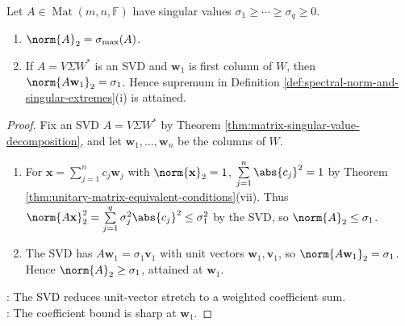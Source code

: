\begin{theorem} \label{thm:spectral-norm-largest-singular-value} \\
Let $A\in\operatorname{Mat}(m,n,\mathbb{F})$ have singular values $\sigma_1\geq\cdots\geq\sigma_q\geq0$.
\begin{enumerate}[label=(\roman*)]
\setlength{\itemsep}{0pt}
\item $\norm{A}_2=\sigma_{\max}(A)$.
\item If $A=V\Sigma W^*$ is an SVD and $\mathbf{w}_1$ is first column of $W$, then $\norm{A\mathbf{w}_1}_2=\sigma_1$. Hence supremum in Definition \ref{def:spectral-norm-and-singular-extremes}(i) is attained.
\end{enumerate}
\begin{proof}
Fix an SVD $A=V\Sigma W^*$ by Theorem \ref{thm:matrix-singular-value-decomposition}, and let $\mathbf{w}_1,\ldots,\mathbf{w}_n$ be the columns of $W$.
\begin{enumerate}[label=(\roman*)]
\setlength{\itemsep}{0pt}
\item For $\mathbf{x}=\sum\limits_{j=1}^{n}c_j\mathbf{w}_j$ with $\norm{\mathbf{x}}_2=1$, $\sum\limits_{j=1}^{n}\abs{c_j}^2=1$ by Theorem \ref{thm:unitary-matrix-equivalent-conditions}(vii). Thus $\norm{A\mathbf{x}}_2^2=\sum\limits_{j=1}^{q}\sigma_j^2\abs{c_j}^2\leq\sigma_1^2$ by the SVD, so $\norm{A}_2\leq\sigma_1$.
\item The SVD has $A\mathbf{w}_1=\sigma_1\mathbf{v}_1$ with unit vectors $\mathbf{w}_1,\mathbf{v}_1$, so $\norm{A\mathbf{w}_1}_2=\sigma_1$. Hence $\norm{A}_2\geq\sigma_1$, attained at $\mathbf{w}_1$.
\end{enumerate}
: The SVD reduces unit-vector stretch to a weighted coefficient sum.\\
: The coefficient bound is sharp at $\mathbf{w}_1$.
\end{proof}
\end{theorem}

